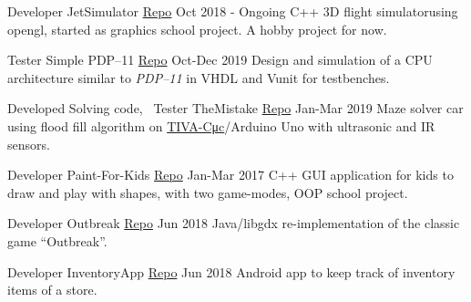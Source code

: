 \begin{cventries}
  \cventry
    {Developer} %
    {JetSimulator \tiny{\href{https://github.com/mido3ds/JetSimulator}{Repo}}} %
    {} %
    {Oct 2018 - Ongoing} %
    {
      {C++ 3D​ ​flight simulator​ using opengl, started as graphics school project. A hobby project for now.}
    }

    \cventry
    {Tester} %
    {Simple PDP--11 \tiny{\href{https://github.com/mido3ds/simple-pdp11}{Repo}}} %
    {} %
    {Oct-Dec 2019} %
    {
      Design and simulation of a CPU architecture similar to \emph{PDP--11} in VHDL and Vunit for testbenches.
    }

    \cventry
    {Developed Solving code, ~Tester} %
    {TheMistake \tiny{\href{https://www.github.com/Abdulrahman-Khalid/mazeSolver}{Repo}}} %
    {} %
    {Jan-Mar 2019} %
    {
      {Maze solver ​car using flood fill algorithm on \href{http://www.ti.com/tool/EK-TM4C123GXL}{​TIVA-C ​μc}​/Arduino Uno with ultrasonic and IR sensors.}
    }

  \cventry
    {Developer} %
    {Paint-For-Kids \tiny{\href{https://github.com/mido3ds/paint-for-kids}{Repo}}} %
    {} %
    {Jan-Mar 2017} %
    {
      {C++ ​GUI​ application for kids to ​ draw​ and play with shapes, with ​two game-modes​, OOP school project.}
    }

  \cventry
    {Developer} %
    {Outbreak \tiny{\href{https://github.com/mido3ds/Outbreak}{Repo}}} %
    {} %
    {Jun 2018} %
    {
      {Java​/libgdx re-implementation of the classic ​game​ ``Outbreak”.}
    }

  \cventry
    {Developer} %
    {InventoryApp \tiny{\href{https://github.com/mido3ds/InventoryApp}{Repo}}} %
    {} %
    {Jun 2018} %
    {
      Android​ app to keep track of inventory ​items of a store​.
    }

\end{cventries}
